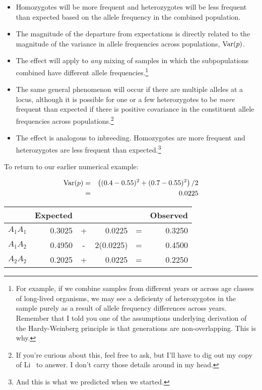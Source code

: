 \documentclass[12pt]{article}
\begin{document}
\begin{itemize}

\item Homozygotes will be more frequent and heterozygotes will be less
  frequent than expected based on the allele frequency in the combined
  population.

\item The magnitude of the departure from expectations is directly
  related to the magnitude of the variance in allele frequencies
  across populations, $\hbox{Var}(p)$.

\item The effect will apply to {\it any\/} mixing of samples in which
  the subpopulations combined have different allele
  frequencies.\footnote{For example, if we combine samples from
    different years or across age classes of long-lived organisms, we
    may see a deficienty of heterozygotes in the sample purely as a
    result of allele frequency differences across years. Remember that
    I told you one of the assumptions underlying derivation of the
    Hardy-Weinberg principle is that generations are
    non-overlapping. This is why.}

\item The same general phenomenon will occur if there are multiple
  alleles at a locus, although it is possible for one or a few
  heterozygotes to be {\it more\/} frequent than expected if there is
  positive covariance in the constituent allele frequencies across
  populations.\footnote{If you're curious about this, feel free to
    ask, but I'll have to dig out my copy of Li~\cite{Li-1976} to
    answer. I don't carry those details around in my head.}

\item The effect is analogous to inbreeding. Homozygotes are more
  frequent and heterozygotes are less frequent than
  expected.\footnote{And this is what we predicted when we started.}

\end{itemize}

To return to our earlier numerical example:

\begin{eqnarray}
\hbox{Var}(p) &=& \left((0.4 - 0.55)^2 + (0.7 - 0.55)^2\right)/2 \\
              &=& 0.0225
\end{eqnarray}
\begin{center}
\begin{tabular}{l|rcrcr}
\hline\hline
         & Expected &   &           &   & Observed \\
\hline
$A_1A_1$ &   0.3025 & + &   0.0225  & = &   0.3250 \\
$A_1A_2$ &   0.4950 & - & 2(0.0225) & = &   0.4500 \\
$A_2A_2$ &   0.2025 & + &   0.0225  & = &   0.2250 \\
\hline
\end{tabular}
\end{center}
\end{document}
